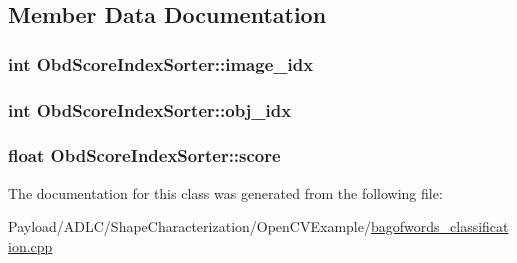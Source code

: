 \subsection{Member Data Documentation}
\hypertarget{classObdScoreIndexSorter_af88d59b2fcc6d307feca504bf6b5f532}{
\subsubsection[{image\-\_\-idx}]{\setlength{\rightskip}{0pt plus 5cm}int Obd\-Score\-Index\-Sorter\-::image\-\_\-idx}}\label{classObdScoreIndexSorter_af88d59b2fcc6d307feca504bf6b5f532}
\hypertarget{classObdScoreIndexSorter_a691c567e854be72a33d81e3753fe1919}{
\subsubsection[{obj\-\_\-idx}]{\setlength{\rightskip}{0pt plus 5cm}int Obd\-Score\-Index\-Sorter\-::obj\-\_\-idx}}\label{classObdScoreIndexSorter_a691c567e854be72a33d81e3753fe1919}
\hypertarget{classObdScoreIndexSorter_a5c0adb2f526d018b41271e2898278fe7}{
\subsubsection[{score}]{\setlength{\rightskip}{0pt plus 5cm}float Obd\-Score\-Index\-Sorter\-::score}}\label{classObdScoreIndexSorter_a5c0adb2f526d018b41271e2898278fe7}


The documentation for this class was generated from the following file\-:\begin{DoxyCompactItemize}
\item 
Payload/\-A\-D\-L\-C/\-Shape\-Characterization/\-Open\-C\-V\-Example/\hyperlink{bagofwords__classification_8cpp}{bagofwords\-\_\-classification.\-cpp}\end{DoxyCompactItemize}
